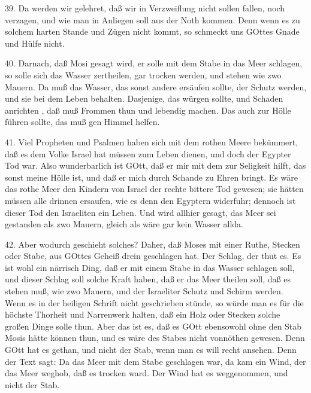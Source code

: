 39. Da werden wir gelehret, daß wir in Verzweiflung nicht sollen fallen, noch verzagen, und wie man in Anliegen soll aus der Noth kommen. Denn wenn es zu solchem harten Stande und Zügen nicht kommt, so schmeckt uns GOttes Gnade und Hülfe nicht.

40. Darnach, daß Mosi gesagt wird, er solle mit dem Stabe in das Meer schlagen, so solle sich das Wasser zertheilen, gar trocken werden, und stehen wie zwo Mauern. Da muß das Wasser, das sonst andere ersäufen sollte, der Schutz werden, und sie bei dem Leben behalten. Dasjenige, das würgen sollte, und Schaden anrichten
, daß muß Frommen thun und lebendig machen. Das auch zur Hölle führen sollte, das muß gen Himmel helfen.

41. Viel Propheten und Psalmen haben sich mit dem rothen Meere bekümmert, daß es dem Volke Israel hat müssen zum Leben dienen, und doch der Egypter Tod war. Also wunderbarlich ist GOtt, daß er mir mit dem zur Seligkeit hilft, das sonst meine Hölle ist, und daß er mich durch Schande zu Ehren bringt. Es wäre das rothe Meer den Kindern von Israel der rechte bittere Tod gewesen; sie hätten müssen alle drinnen ersaufen, wie es denn den Egyptern widerfuhr; dennoch ist dieser Tod den Israeliten ein Leben. Und wird allhier gesagt, das Meer sei gestanden als zwo Mauern, gleich als wäre gar kein Wasser allda.

42. Aber wodurch geschieht solches? Daher, daß Moses mit einer Ruthe, Stecken oder Stabe, aus GOttes Geheiß drein geschlagen hat. Der Schlag, der thut es. Es ist wohl ein närrisch Ding, daß er mit einem Stabe in das Wasser schlagen soll, und dieser Schlag soll solche Kraft haben, daß er das Meer theilen soll, daß es stehen muß, wie zwo Mauern, und der Israeliter Schutz und Schirm werden. Wenn es in der heiligen Schrift nicht geschrieben stünde, so würde man es für die höchste Thorheit und Narrenwerk halten, daß ein Holz oder Stecken solche großen Dinge solle thun. Aber das ist es, daß es GOtt ebensowohl ohne den Stab Mosis hätte können thun, und es wäre des Stabes nicht vonnöthen gewesen. Denn GOtt hat es gethan, und nicht der Stab, wenn man es will recht ansehen. Denn der Text sagt: Da das Meer mit dem Stabe geschlagen war, da kam ein Wind, der das Meer weghob, daß es trocken ward. Der Wind hat es weggenommen, und nicht der Stab.

